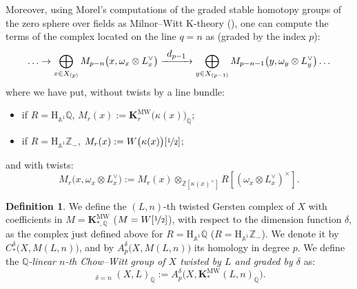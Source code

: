 \documentclass[JEP,XML,SOM,Unicode]{cedram}
\def\To#1{\mathchoice{\xrightarrow{\textstyle\kern4pt#1\kern3pt}}{\stackrel{#1}{\longrightarrow}}{}{}}
\renewcommand{\AA}{\mathbb A}
\newcommand{\KMW}{\mathbf K^\mathrm{MW}}
\newcommand{\HA}{\mathrm H_{\AA^1}}
\DeclareMathOperator{\wCH}{\widetilde{CH}}
\newcommand{\ZZ} {\mathbb Z}
\newcommand{\ot} {{\nicefrac 1 2}}
\newcommand{\QQ} {\mathbb Q}
\theoremstyle{remark}
\theoremstyle{definition}
\newtheorem{df}[thm]{Definition}
\numberwithin{equation}{thm}
\begin{document}
Moreover, using Morel's computations of the graded stable homotopy groups of the zero sphere over fields
as Milnor--Witt K-theory (\cf \cite{MorelA1}),
one can compute the terms of the complex located on the line $q=n$ as (graded by the index $p$):
\begin{equation*}
\hdots \to \bigoplus_{x \in X_{(p)}} M_{p-n}\big(x,\omega_x \otimes L_x^\vee\big)
\To{d_{p-1}} \bigoplus_{y \in X_{(p-1)}} M_{p-n-1}\big(y,\omega_y \otimes L_y^\vee\big) \hdots
\end{equation*}
where we have put, without twists by a line bundle:
\begin{itemize}
\item if $R=\HA \QQ$, $M_r(x):=\KMW_r\big(\kappa(x)\big)_\QQ$;
\item if $R=\HA \ZZ_-$, $M_r(x):=W\big(\kappa(x)\big)[\ot]$;
\end{itemize}
and with twists:
\[
M_r\big(x,\omega_x \otimes L_x^\vee\big):=M_r(x) \otimes_{\ZZ[\kappa(x)^\times]} R[(\omega_x \otimes L_x^\vee)^\times].
\]

\begin{df}
\label{df:CHtilde}
We define the $(L,n)$-th twisted Gersten complex of $X$ with coefficients in $M=\KMW_{*,\QQ}$
(\resp $M=W[\ot]$),
with respect to the dimension function $\delta$, as the complex just defined above
for $R=\HA \QQ$ (\resp $R=\HA \ZZ_-$).
We denote it by $C^\delta_*\big(X,M(L,n)\big)$,
and by $A^\delta_p\big(X,M(L,n)\big)$ its homology in degree $p$.
We define the \emph{$\QQ$-linear $n$-th Chow--Witt group of $X$ twisted by $L$ and graded by $\delta$} as:
\[
\wCH_{\delta=n}(X,L)_\QQ:=A^\delta_p\big(X,\KMW_*(L,n)_\QQ\big).
\]
\end{df}
\end{document}
